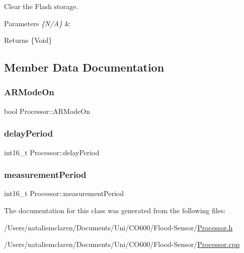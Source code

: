 Clear the Flash storage. 
\begin{DoxyParams}{Parameters}
{\em \{\+N/\+A\}} & \\
\hline
\end{DoxyParams}
\begin{DoxyReturn}{Returns}
\{Void\} 
\end{DoxyReturn}


\subsection{Member Data Documentation}
\mbox{\label{class_processor_af51b6b3ce7074068195b5d3eb2442fdb}} 
\subsubsection{\texorpdfstring{A\+R\+Mode\+On}{ARModeOn}}
{\footnotesize\ttfamily bool Processor\+::\+A\+R\+Mode\+On}

\mbox{\label{class_processor_acfaad87bb46ff80f1b7966624542e6ef}} 
\subsubsection{\texorpdfstring{delay\+Period}{delayPeriod}}
{\footnotesize\ttfamily int16\+\_\+t Processor\+::delay\+Period}

\mbox{\label{class_processor_a5cb8792cf0882b5466eea2b8e0816684}} 
\subsubsection{\texorpdfstring{measurement\+Period}{measurementPeriod}}
{\footnotesize\ttfamily int16\+\_\+t Processor\+::measurement\+Period}



The documentation for this class was generated from the following files\+:\begin{DoxyCompactItemize}
\item 
/\+Users/nataliemclaren/\+Documents/\+Uni/\+C\+O600/\+Flood-\/\+Sensor/\mbox{\hyperlink{_processor_8h}{Processor.\+h}}\item 
/\+Users/nataliemclaren/\+Documents/\+Uni/\+C\+O600/\+Flood-\/\+Sensor/\mbox{\hyperlink{_processor_8cpp}{Processor.\+cpp}}\end{DoxyCompactItemize}
